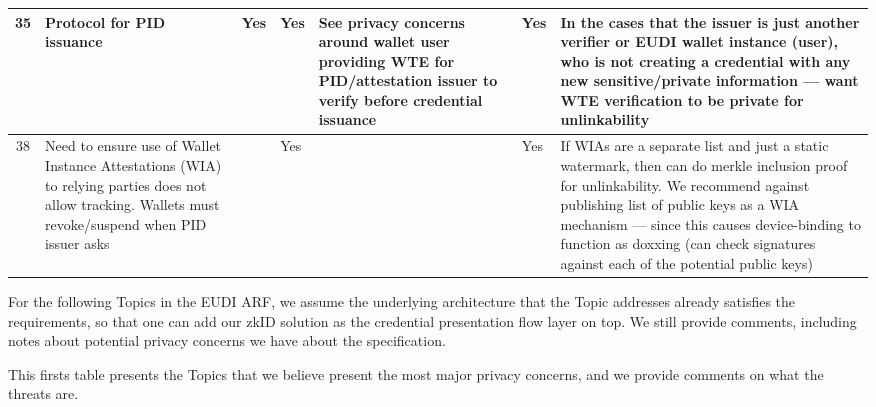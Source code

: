\begin{longtable}{|c|p{}|p{}|p{}|p{}|p{}|p{}|}
35 & Protocol for PID issuance & Yes & Yes & See privacy concerns around wallet user providing WTE for PID/attestation issuer to verify before credential issuance & Yes & In the cases that the issuer is just another verifier or EUDI wallet instance (user), who is not creating a credential with any new sensitive/private information — want WTE verification to be private for unlinkability \\
\hline

38 & Need to ensure use of Wallet Instance Attestations (WIA) to relying parties does not allow tracking. Wallets must revoke/suspend when PID issuer asks & & Yes & & Yes & If WIAs are a separate list and just a static watermark, then can do merkle inclusion proof for unlinkability. We recommend against publishing list of public keys as a WIA mechanism — since this causes device-binding to function as doxxing (can check signatures against each of the potential public keys) \\
\hline


\hline


\end{longtable}

For the following Topics in the EUDI ARF, we assume the underlying architecture that the Topic addresses already satisfies the requirements, so that one can add our zkID solution as the credential presentation flow layer on top. We still provide comments, including notes about potential privacy concerns we have about the specification.  

This firsts table presents the Topics that we believe present the most major privacy concerns, and we provide comments on what the threats are.


